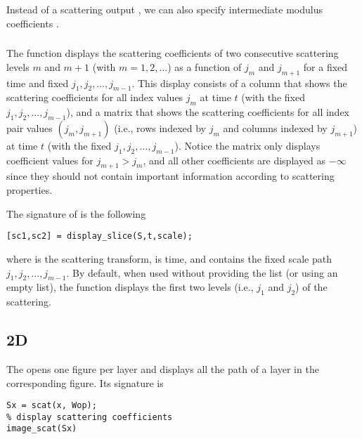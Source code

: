 \documentclass{article}
\begin{document}
Instead of a scattering output , we can also specify intermediate modulus coefficients .

\subsubsection{}

The  function displays the scattering coefficients of two consecutive scattering levels $m$ and $m+1$ (with $m = 1, 2, \ldots$) as a function of $j_m$ and $j_{m+1}$ for a fixed time and fixed $j_1, j_2, \ldots, j_{m-1}$. This display consists of a column that shows the scattering coefficients for all index values $j_m$ at time $t$ (with the fixed $j_1, j_2, \ldots, j_{m-1}$), and a matrix that shows the scattering coefficients for all index pair values $(j_m,j_{m+1})$ (i.e., rows indexed by $j_m$ and columns indexed by $j_{m+1}$) at time $t$ (with the fixed $j_1, j_2, \ldots, j_{m-1}$). Notice the matrix only displays coefficient values for $j_{m+1} > j_m$, and all other coefficients are displayed as $-\infty$ since they should not contain important information according to scattering properties.

The signature of  is the following
\begin{lstlisting}
[sc1,sc2] = display_slice(S,t,scale);
\end{lstlisting}
where  is the scattering transform,  is time, and  contains the fixed scale path $j_1, j_2, \ldots, j_{m-1}$. By default, when used without providing the  list (or using an empty list), the function displays the first two levels (i.e., $j_1$ and $j_2$) of the scattering.

\subsection{2D}

The  opens one figure per layer and displays all the path of a layer in the corresponding figure. Its signature is 
\begin{lstlisting}
Sx = scat(x, Wop);
% display scattering coefficients
image_scat(Sx)
\end{lstlisting}
\end{document}
